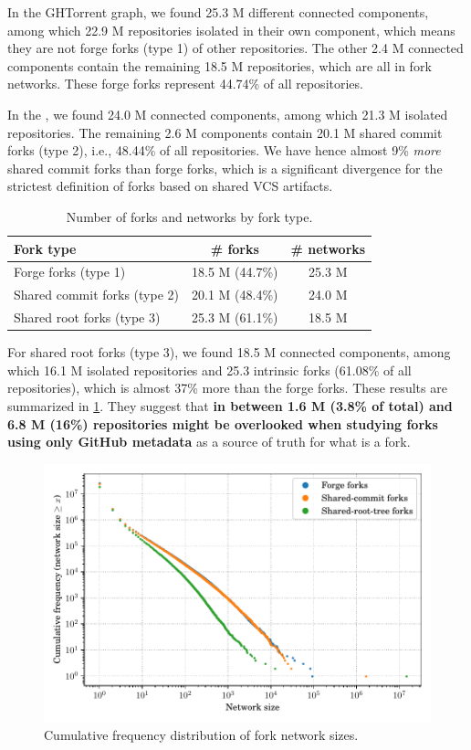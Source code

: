 In the GHTorrent graph, we found 25.3 M different connected components, among
which 22.9 M repositories isolated in their own component, which means they are
not forge forks (type 1) of other repositories.  The other 2.4 M connected
components contain the remaining 18.5 M repositories, which are all in fork
networks.  These forge forks represent 44.74\% of all repositories.

In the \SWHGD{}, we found 24.0 M connected components, among which 21.3 M
isolated repositories. The remaining 2.6 M components contain 20.1 M shared
commit forks (type 2), i.e., 48.44\% of all repositories. We have hence almost
9\% \emph{more} shared commit forks than forge forks, which is a significant
divergence for the strictest definition of forks based on shared \gls{VCS}
artifacts.

\begin{table}[t]
    \centering
    \caption{Number of forks and networks by fork type.}%
    \label{tab:fork-network-results}
    \begin{tabular}{l|c|c}
      \textbf{Fork type} & \textbf{\# forks} & \textbf{\# networks} \\
      \hline
      Forge forks (type 1)         & 18.5 M (44.7\%) & 25.3 M \\
      Shared commit forks (type 2) & 20.1 M (48.4\%) & 24.0 M \\
      Shared root forks (type 3)   & 25.3 M (61.1\%) & 18.5 M \\
    \end{tabular}
\end{table}

For shared root forks (type 3), we found 18.5 M connected components, among
which 16.1 M isolated repositories and 25.3 intrinsic forks (61.08\% of all
repositories), which is almost 37\% more than the forge forks. These results
are summarized in \cref{tab:fork-network-results}.  They suggest that
\textbf{in between 1.6 M (3.8\% of total) and 6.8 M (16\%) repositories might
  be overlooked when studying forks using only GitHub metadata} as a source of
truth for what is a fork.

\begin{figure}[t]
    \centering
    \includegraphics[width=0.8\linewidth]{img/forks/fork-network-freq-distribution.pdf}
    \caption{Cumulative frequency distribution of fork network sizes.}%
    \label{fig:fork-network-freq-distrib}
\end{figure}

